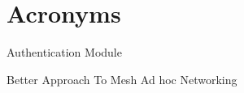 \chapter*{Acronyms}

\begin{acronym}



 {Authentication Module}

 {Better Approach To Mesh Ad hoc Networking}



















%

\end{acronym}
